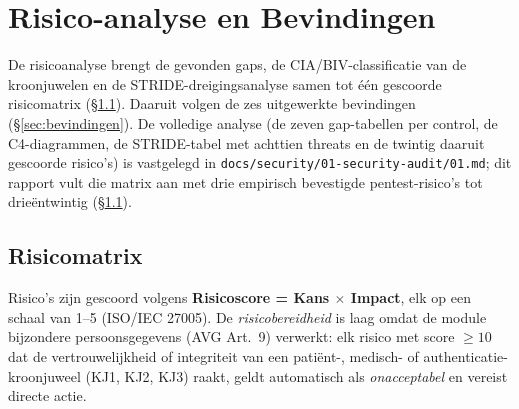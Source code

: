 \documentclass[12pt, a4paper]{report}
\begin{document}
\newpage

\chapter{Risico-analyse en Bevindingen}
\label{ch:bevindingen}

De risicoanalyse brengt de gevonden gaps, de CIA/BIV-classificatie van de
kroonjuwelen en de STRIDE-dreigingsanalyse samen tot één gescoorde risicomatrix
(\S\ref{sec:risicomatrix}). Daaruit volgen de zes uitgewerkte bevindingen
(\S\ref{sec:bevindingen}). De volledige analyse (de zeven gap-tabellen per
control, de C4-diagrammen, de STRIDE-tabel met achttien threats en de twintig
daaruit gescoorde risico's) is vastgelegd in
\texttt{docs/security/01-security-audit/01.md}; dit rapport vult die matrix aan
met drie empirisch bevestigde pentest-risico's tot drieëntwintig
(\S\ref{sec:risicomatrix}).

\section{Risicomatrix}
\label{sec:risicomatrix}

Risico's zijn gescoord volgens \textbf{Risicoscore = Kans $\times$ Impact}, elk op
een schaal van 1--5 (ISO/IEC 27005). De \emph{risicobereidheid} is laag omdat de
module bijzondere persoonsgegevens (AVG Art.~9) verwerkt: elk risico met score
$\geq 10$ dat de vertrouwelijkheid of integriteit van een patiënt-, medisch- of
authenticatie-kroonjuweel (KJ1, KJ2, KJ3) raakt, geldt automatisch als
\emph{onacceptabel} en vereist directe actie.
\end{document}
